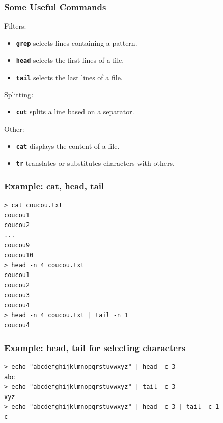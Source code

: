\documentclass{beamer}
\newenvironment{terminal}{\color{white}\begin{snugshade*}}
{\end{snugshade*}\color{black}}
\begin{document}
\begin{frame}[fragile]
\frametitle{Some Useful Commands}
Filters:
\begin{itemize}
\item  \texttt{\bf grep} selects lines containing a pattern.
\item \texttt{\bf head} selects the first lines of a file.
\item \texttt{\bf tail} selects the last lines of a file.
\end{itemize}

Splitting:
\begin{itemize}
\item \texttt{\bf cut} splits a line based on a separator.
\end{itemize}

Other:
\begin{itemize}
\item \texttt{\bf cat} displays the content of a file.
\item \texttt{\bf tr} translates or substitutes characters with others.
\end{itemize}

\end{frame}


\begin{frame}[fragile]
  \frametitle{Example: cat, head, tail}
  \begin{terminal}
\begin{verbatim}
> cat coucou.txt
coucou1
coucou2
...
coucou9
coucou10
> head -n 4 coucou.txt
coucou1
coucou2
coucou3
coucou4
> head -n 4 coucou.txt | tail -n 1
coucou4
\end{verbatim}
\end{terminal}
\end{frame}


\begin{frame}[fragile]
  \frametitle{Example: head, tail for selecting characters}
  \begin{terminal}
        \begin{scriptsize}
\begin{verbatim}
> echo "abcdefghijklmnopqrstuvwxyz" | head -c 3
abc
> echo "abcdefghijklmnopqrstuvwxyz" | tail -c 3
xyz
> echo "abcdefghijklmnopqrstuvwxyz" | head -c 3 | tail -c 1
c
\end{verbatim}
\end{scriptsize}
\end{terminal}

\end{frame}
\end{document}
